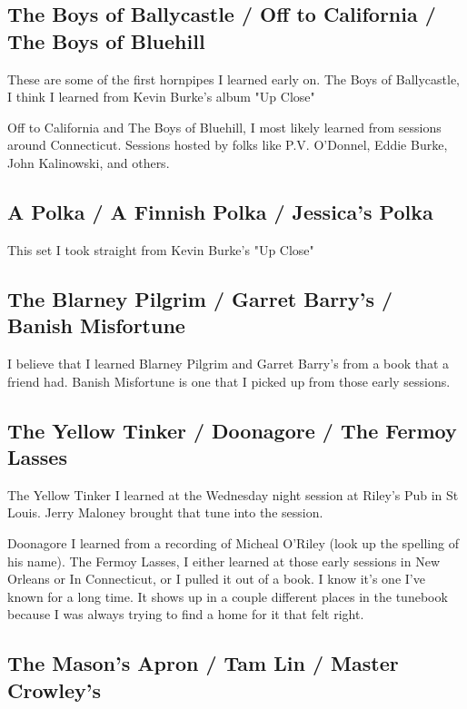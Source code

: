 \documentclass[11pt,letterpaper]{article}
\begin{document}
\subsection*{The Boys of Ballycastle / Off to California / The Boys of Bluehill}

These are some of the first hornpipes I learned early on. The Boys of Ballycastle, I think I learned from Kevin Burke's album "Up Close"

Off to California and The Boys of Bluehill, I most likely learned from sessions around Connecticut. Sessions hosted by folks like P.V. O'Donnel, Eddie Burke, John Kalinowski, and others.

\subsection*{A Polka / A Finnish Polka / Jessica's Polka}

This set I took straight from Kevin Burke's "Up Close"

\subsection*{The Blarney Pilgrim / Garret Barry's / Banish Misfortune}

I believe that I learned Blarney Pilgrim and Garret Barry's from a book that a friend had. Banish Misfortune is one that I picked up from those early sessions.

\subsection*{The Yellow Tinker / Doonagore / The Fermoy Lasses}

The Yellow Tinker I learned at the Wednesday night session at Riley's Pub in St Louis. Jerry Maloney brought that tune into the session.

Doonagore I learned from a recording of Micheal O'Riley (look up the spelling of his name). The Fermoy Lasses, I either learned at those early sessions in New Orleans or In Connecticut, or I pulled it out of a book. I know it's one I've known for a long time. It shows up in a couple different places in the tunebook because I was always trying to find a home for it that felt right. 

\subsection*{The Mason's Apron / Tam Lin / Master Crowley's}
\end{document}
